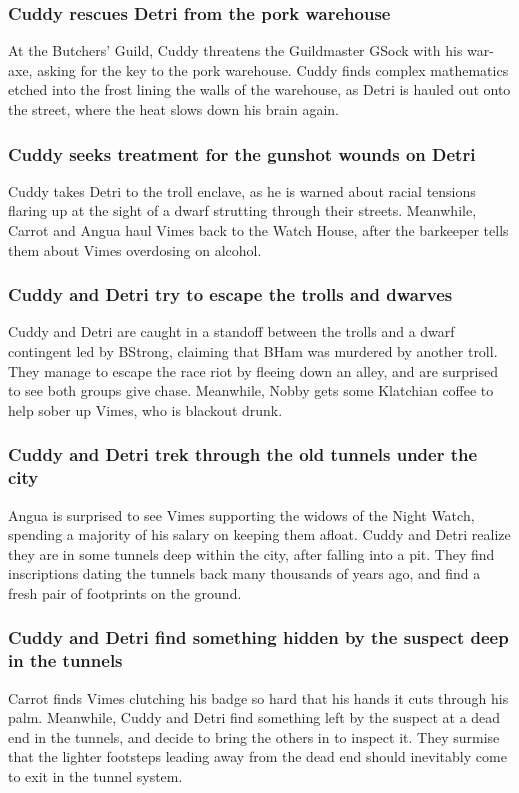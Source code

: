 \subsubsection{\Gls{Cuddy} rescues \Gls{Detri} from the pork warehouse}
At the Butchers' Guild, \Gls{Cuddy} threatens the Guildmaster \Gls{GSock} with his war-axe, asking
for the key to the pork warehouse. \Gls{Cuddy} finds complex mathematics etched into the frost
lining the walls of the warehouse, as \Gls{Detri} is hauled out onto the street, where the heat
slows down his brain again.

\subsubsection{\Gls{Cuddy} seeks treatment for the gunshot wounds on \Gls{Detri}}
\Gls{Cuddy} takes \Gls{Detri} to the troll enclave, as he is warned about racial tensions flaring up
at the sight of a dwarf strutting through their streets. Meanwhile, \Gls{Carrot} and \Gls{Angua}
haul \Gls{Vimes} back to the Watch House, after the barkeeper tells them about \Gls{Vimes}
overdosing on alcohol.

\subsubsection{\Gls{Cuddy} and \Gls{Detri} try to escape the trolls and dwarves}
\Gls{Cuddy} and \Gls{Detri} are caught in a standoff between the trolls and a dwarf contingent led
by \Gls{BStrong}, claiming that \Gls{BHam} was murdered by another troll. They manage to escape the
race riot by fleeing down an alley, and are surprised to see both groups give chase. Meanwhile,
\Gls{Nobby} gets some Klatchian coffee to help sober up \Gls{Vimes}, who is blackout drunk.

\subsubsection{\Gls{Cuddy} and \Gls{Detri} trek through the old tunnels under the city}
\Gls{Angua} is surprised to see \Gls{Vimes} supporting the widows of the Night Watch, spending a
majority of his salary on keeping them afloat. \Gls{Cuddy} and \Gls{Detri} realize they are in
some tunnels deep within the city, after falling into a pit. They find inscriptions dating the
tunnels back many thousands of years ago, and find a fresh pair of footprints on the ground.

\subsubsection{\Gls{Cuddy} and \Gls{Detri} find something hidden by the suspect deep in the tunnels}
\Gls{Carrot} finds \Gls{Vimes} clutching his badge so hard that his hands it cuts through his palm.
Meanwhile, \Gls{Cuddy} and \Gls{Detri} find something left by the suspect at a dead end in the
tunnels, and decide to bring the others in to inspect it. They surmise that the lighter footsteps
leading away from the dead end should inevitably come to exit in the tunnel system.

